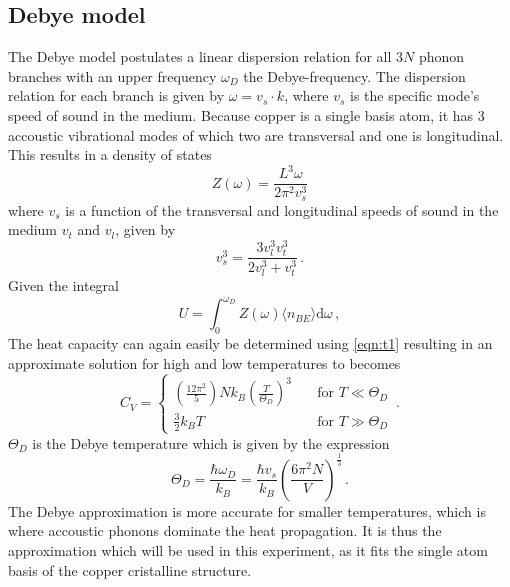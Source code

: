 \subsection{Debye model}
The Debye model postulates a linear dispersion relation for all $3N$ phonon branches with an upper frequency $\omega_D$ the Debye-frequency. The dispersion relation for each branch is given by $\omega = v_s \cdot k$, where $v_s$ is the specific mode's speed of sound in the medium.
Because copper is a single basis atom, it has 3 accoustic vibrational modes of which two are transversal and one is longitudinal. This results in a density of states 
\begin{equation}
    Z \left(\omega\right) = \frac{L^3 \omega}{2 \pi^2 v_s^3}
\end{equation}
where $v_s$ is a function of the transversal and longitudinal speeds of sound in the medium $v_t$ and $v_l$, given by
\begin{equation}
    v_s^3 = \frac{3 v_l^3 v_t^3}{2v_l^3 + v_t^3} \, .
\end{equation}
Given the integral
\begin{equation}
U = \int_0^{\omega_D} Z\left(\omega\right) \langle n_{BE} \rangle \text{d}\omega \, ,
\end{equation}
The heat capacity can again easily be determined using \autoref{eqn:t1} resulting in an approximate solution for high and low temperatures to becomes
\begin{equation}
    C_V = 
    \begin{cases}
        \left(\frac{12 \pi^2}{5}\right) N k_B \left( \frac{T}{\Theta_D} \right)^3 &\quad \text{for } T \ll \Theta_D\\
        \frac{3}{2} k_B T &\quad \text{for } T \gg \Theta_D
    \end{cases}
    \, .
\end{equation}
$\Theta_D$ is the Debye temperature which is given by the expression
\begin{equation}
    \Theta_D = \frac{\hbar \omega_D}{k_B} = \frac{\hbar v_s}{k_B}\left( \frac{6 \pi^2 N}{V} \right)^{\frac{1}{3}} \, .
\end{equation}
The Debye approximation is more accurate for smaller temperatures, which is where accoustic phonons dominate the heat propagation. It is thus the approximation which will be used in this experiment, as it fits the single atom basis of the copper cristalline structure.



\newpage
